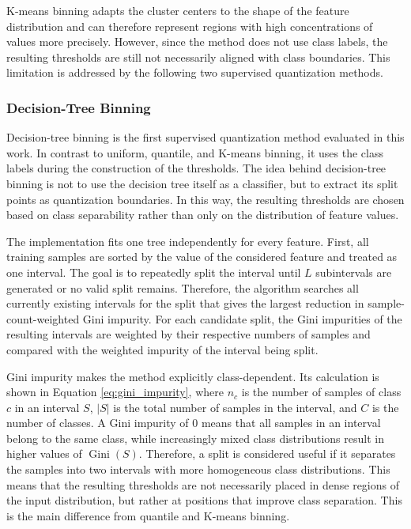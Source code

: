         K-means binning adapts the cluster centers to the shape of the feature distribution and can therefore represent regions with high concentrations of values more precisely. However, since the method does not use class labels, the resulting thresholds are still not necessarily aligned with class boundaries. This limitation is addressed by the following two supervised quantization methods.
        
        \subsubsection{Decision-Tree Binning}
        \label{sec:DecisiontreeBinning}
        
        Decision-tree binning is the first supervised quantization method evaluated in this work. In contrast to uniform, quantile, and K-means binning, it uses the class labels during the construction of the thresholds. The idea behind decision-tree binning is not to use the decision tree itself as a classifier, but to extract its split points as quantization boundaries. In this way, the resulting thresholds are chosen based on class separability rather than only on the distribution of feature values.

        The implementation fits one tree independently for every feature. First, all training samples are sorted by the value of the considered feature and treated as one interval. The goal is to repeatedly split the interval until $L$ subintervals are generated or no valid split remains. Therefore, the algorithm searches all currently existing intervals for the split that gives the largest reduction in sample-count-weighted Gini impurity. For each candidate split, the Gini impurities of the resulting intervals are weighted by their respective numbers of samples and compared with the weighted impurity of the interval being split.
        
        Gini impurity makes the method explicitly class-dependent. Its calculation is shown in Equation \ref{eq:gini_impurity}, where $n_c$ is the number of samples of class $c$ in an interval $S$, $|S|$ is the total number of samples in the interval, and $C$ is the number of classes.       
        A Gini impurity of 0 means that all samples in an interval belong to the same class, while increasingly mixed class distributions result in higher values of $\operatorname{Gini}(S)$. Therefore, a split is considered useful if it separates the samples into two intervals with more homogeneous class distributions. This means that the resulting thresholds are not necessarily placed in dense regions of the input distribution, but rather at positions that improve class separation. This is the main difference from quantile and K-means binning.
        
